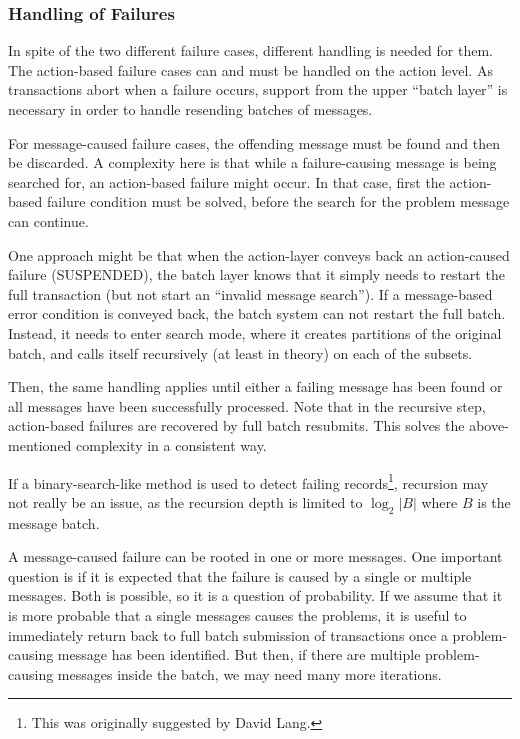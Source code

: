 \documentclass[a4paper,10pt]{article}
\begin{document}
\subsubsection{Handling of Failures}
In spite of the two different failure cases, different handling is needed for them. The action-based failure cases can and must be handled on the action level. As transactions abort when a failure occurs, support from the upper ``batch layer'' is necessary in order to handle resending batches of messages.

For message-caused failure cases, the offending message must be found and then be discarded. A complexity here is that while a failure-causing message is being searched for, an action-based failure might occur. In that case, first the action-based failure condition must be solved, before the search for the problem message can continue.

One approach might be that when the action-layer conveys back an action-caused failure (SUSPENDED), the batch layer knows that it simply needs to restart the full transaction (but not start an ``invalid message search''). If a message-based error condition is conveyed back, the batch system can not restart the full batch. Instead, it needs to enter search mode, where it creates partitions of the original batch, and calls itself recursively (at least in theory) on each of the subsets.

Then, the same handling applies until either a failing message has been found or all messages have been successfully processed. Note that in the recursive step, action-based failures are recovered by full batch resubmits. This solves the above-mentioned complexity in a consistent way.

If a binary-search-like method is used to detect failing records\footnote{This was originally suggested by David Lang.}, recursion may not really be an issue, as the recursion depth is limited to $\log_2 |B|$ where $B$ is the message batch.

A message-caused failure can be rooted in one or more messages. One important question is if it is expected that the failure is caused by a single or multiple messages. Both is possible, so it is a question of probability. If we assume that it is more probable that a single messages causes the problems, it is useful to immediately return back to full batch submission of transactions once a problem-causing message has been identified. But then, if there are multiple problem-causing messages inside the batch, we may need many more iterations.
\end{document}
